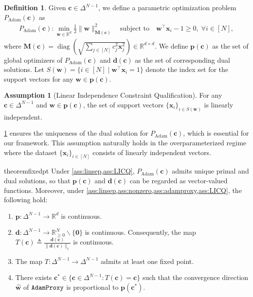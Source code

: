 \documentclass{article} %
\theoremstyle{plain}
\theoremstyle{definition}
\newtheorem{definition}[theorem]{Definition}
\newtheorem{assumption}[theorem]{Assumption}
\theoremstyle{remark}
\def\sR{{\mathbb{R}}}
\newcommand{\R}{\mathbb{R}}
\def\bx{{\mathbf x}}
\def\bc{{\mathbf c}}
\def\bp{{\mathbf p}}
\def\bw{{\mathbf w}}
\def\bd{{\mathbf d}}
\def\bM{{\mathbf M}}
\DeclareMathOperator{\diag}{diag}
\begin{document}
\begin{definition}
    Given $\bc \in \Delta^{N-1}$, we define a parametric optimization problem $P_{\text{Adam}}(\bc)$ as 
    \begin{align}
        P_{\text{Adam}}(\bc): \min_{\bw\in \sR^d} \frac{1}{2}\|\bw\|_{\bM(\bc)}^2 \quad \text{subject to} \quad \bw^\top\bx_i-1 \geq 0,\; \forall i\in[N],
    \end{align}
    where $\bM(\bc) = \diag(\sqrt{\sum_{j \in [N]}c_j^2\bx_j^2}) \in \R^{d \times d}$. We define $\bp(\bc)$ as the set of global optimizers of $P_{\text{Adam}}(\bc)$ and $\bd(\bc)$ as the set of corresponding dual solutions. Let $S(\bw) = \{i \in [N] \mid \bw^\top\bx_i = 1\}$ denote the index set for the support vectors for any $\bw \in \bp(\bc)$.
\end{definition}


\begin{assumption}[Linear Independence Constraint Qualification] \label{ass:LICQ}
    For any $\bc \in \Delta^{N-1}$ and $\bw \in \bp(\bc)$, the set of support vectors $\{\bx_i\}_{i \in S(\bw)}$ is linearly independent.
\end{assumption}

\cref{ass:LICQ} ensures the uniqueness of the dual solution for $P_{\text{Adam}}(\bc)$, which is essential for our framework. This assumption naturally holds in the overparameterized regime where the dataset $\{\bx_i\}_{i \in [N]}$ consists of linearly independent vectors.

\begin{restatable}{theorem}{fixedpt}\label{thm:fixed_pt}
    Under \cref{ass:linsep,ass:LICQ}, $P_{\text{Adam}}(\bc)$ admits unique primal and dual solutions, so that $\bp(\bc)$ and  $\bd(\bc)$ can be regarded as vector-valued functions. Moreover, under \cref{ass:linsep,ass:nonzero,ass:adamproxy,ass:LICQ}, the following hold:
    \begin{enumerate}[label=(\alph*)]
        \item $\bp:\Delta^{N-1} \rightarrow \R^d$ is continuous.
        \item $\bd:\Delta^{N-1} \rightarrow \R_{\geq 0}^N\backslash\{\mathbf{0}\}$ is continuous. Consequently, the map $T(\bc)\triangleq \frac{\bd(\bc)}{\|\bd(\bc)\|_1}$ is continuous.
        \item The map $T:\Delta^{N-1} \rightarrow \Delta^{N-1}$ admits at least one fixed point.
        \item There exists $\bc^* \in \{\bc \in \Delta^{N-1}:T(\bc)=\bc\}$ such that the convergence direction $\hat{\bw}$ of $\textnormal{\texttt{AdamProxy}}$ is proportional to $\bp(\bc^*)$.
    \end{enumerate}
\end{restatable}
\end{document}
